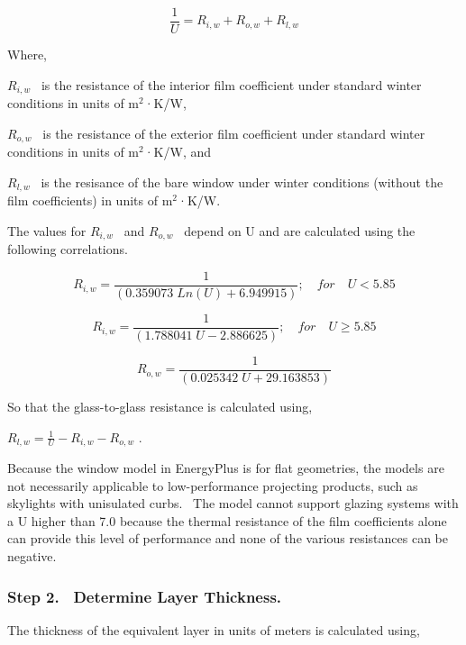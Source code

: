 \begin{equation}
\frac{1}{U} = {R_{i,w}} + {R_{o,w}} + {R_{l,w}}
\end{equation}

Where,

\({R_{i,w}}\) ~is the resistance of the interior film coefficient under standard winter conditions in units of m\(^{2}\)·K/W,

\({R_{o,w}}\) ~is the resistance of the exterior film coefficient under standard winter conditions in units of m\(^{2}\)·K/W, and

\({R_{l,w}}\) ~is the resisance of the bare window under winter conditions (without the film coefficients) in units of m\(^{2}\)·K/W.

The values for \({R_{i,w}}\) ~and \({R_{o,w}}\) ~depend on U and are calculated using the following correlations.

\begin{equation}
{R_{i,w}} = \frac{1}{{(0.359073\;Ln(U) + 6.949915)}};\quad for\quad U < 5.85
\end{equation}

\begin{equation}
{R_{i,w}} = \frac{1}{{(1.788041\;U - 2.886625)}};\quad for\quad U \ge 5.85
\end{equation}

\begin{equation}
{R_{o,w}} = \frac{1}{{(0.025342\;U + 29.163853)}}
\end{equation}

So that the glass-to-glass resistance is calculated using,

\({R_{l,w}} = \frac{1}{U} - {R_{i,w}} - {R_{o,w}}\) .

Because the window model in EnergyPlus is for flat geometries, the models are not necessarily applicable to low-performance projecting products, such as skylights with unisulated curbs.~ The model cannot support glazing systems with a U higher than 7.0 because the thermal resistance of the film coefficients alone can provide this level of performance and none of the various resistances can be negative.

\subsubsection{Step 2.~ Determine Layer Thickness.}\label{step-2.-determine-layer-thickness.}

The thickness of the equivalent layer in units of meters is calculated using,

